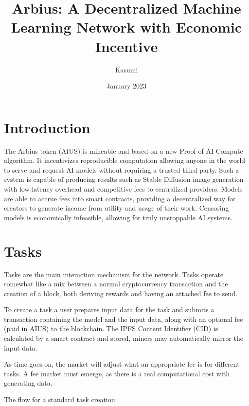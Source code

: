 \documentclass{article}
\title{Arbius: A Decentralized Machine Learning Network with Economic Incentive}
\author{Kasumi}
\date{January 2023}
\begin{document}
\maketitle

\section{Introduction}

The Arbius token (AIUS) is mineable and based on a new Proof-of-AI-Compute algorithm. It incentivizes reproducible computation allowing anyone in the world to serve and request AI models without requiring a trusted third party. Such a system is capable of producing results such as Stable Diffusion\cite{stablediffusion} image generation with low latency overhead and competitive fees to centralized providers. Models are able to accrue fees into smart contracts, providing a decentralized way for creators to generate income from utility and usage of their work. Censoring models is economically infeasible, allowing for truly unstoppable AI systems.

\section{Tasks}

Tasks are the main interaction mechanism for the network. Tasks operate somewhat like a mix between a normal cryptocurrency transaction and the creation of a block, both deriving rewards and having an attached fee to send.

To create a task a user prepares input data for the task and submits a transaction containing the model and the input data, along with an optional fee (paid in AIUS) to the blockchain. The IPFS\cite{benet2014ipfs} Content Identifier (CID) is calculated by a smart contract and stored, miners may automatically mirror the input data.

As time goes on, the market will adjust what an appropriate fee is for different tasks. A fee market must emerge, as there is a real computational cost with generating data.


The flow for a standard task creation:
\end{document}
